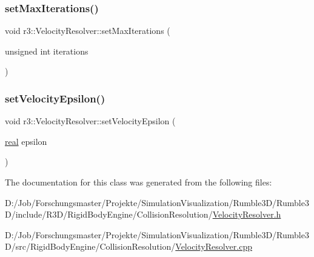 \subsubsection{\texorpdfstring{set\+Max\+Iterations()}{setMaxIterations()}}
{\footnotesize\ttfamily void r3\+::\+Velocity\+Resolver\+::set\+Max\+Iterations (\begin{DoxyParamCaption}\item[{unsigned int}]{iterations }\end{DoxyParamCaption})}

\mbox{\label{classr3_1_1_velocity_resolver_a91b4f4f3c064f11983ae9dbe40232c86}} 
\subsubsection{\texorpdfstring{set\+Velocity\+Epsilon()}{setVelocityEpsilon()}}
{\footnotesize\ttfamily void r3\+::\+Velocity\+Resolver\+::set\+Velocity\+Epsilon (\begin{DoxyParamCaption}\item[{\mbox{\hyperlink{namespacer3_ab2016b3e3f743fb735afce242f0dc1eb}{real}}}]{epsilon }\end{DoxyParamCaption})}



The documentation for this class was generated from the following files\+:\begin{DoxyCompactItemize}
\item 
D\+:/\+Job/\+Forschungsmaster/\+Projekte/\+Simulation\+Visualization/\+Rumble3\+D/\+Rumble3\+D/include/\+R3\+D/\+Rigid\+Body\+Engine/\+Collision\+Resolution/\mbox{\hyperlink{_velocity_resolver_8h}{Velocity\+Resolver.\+h}}\item 
D\+:/\+Job/\+Forschungsmaster/\+Projekte/\+Simulation\+Visualization/\+Rumble3\+D/\+Rumble3\+D/src/\+Rigid\+Body\+Engine/\+Collision\+Resolution/\mbox{\hyperlink{_velocity_resolver_8cpp}{Velocity\+Resolver.\+cpp}}\end{DoxyCompactItemize}
